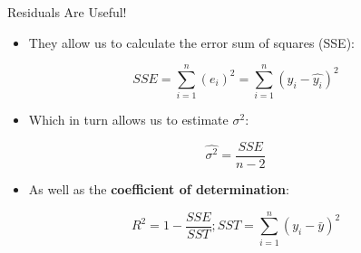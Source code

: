 \documentclass[australian,ignorenonframetext,aspectratio=169]{beamer}
\providecommand{\tightlist}{%
  \setlength{\itemsep}{0pt}\setlength{\parskip}{0pt}}
\begin{document}
\begin{frame}{Residuals Are Useful!}
\protect\hypertarget{residuals-are-useful}{}

\begin{itemize}
\tightlist
\item
  They allow us to calculate the error sum of squares (SSE):
\end{itemize}

\[SSE = \sum_{i=1}^n (e_i)^2 = \sum_{i=1}^n (y_i - \hat{y_i})^2\]

\begin{itemize}
\tightlist
\item
  Which in turn allows us to estimate \(\sigma^2\):
\end{itemize}

\[\hat{\sigma^2} = \frac{SSE}{n-2}\]

\begin{itemize}
\tightlist
\item
  As well as the \textbf{coefficient of determination}:
\end{itemize}

\[R^2 = 1 - \frac{SSE}{SST};  SST = \sum_{i=1}^n (y_i - \bar{y})^2\]

\end{frame}
\end{document}
